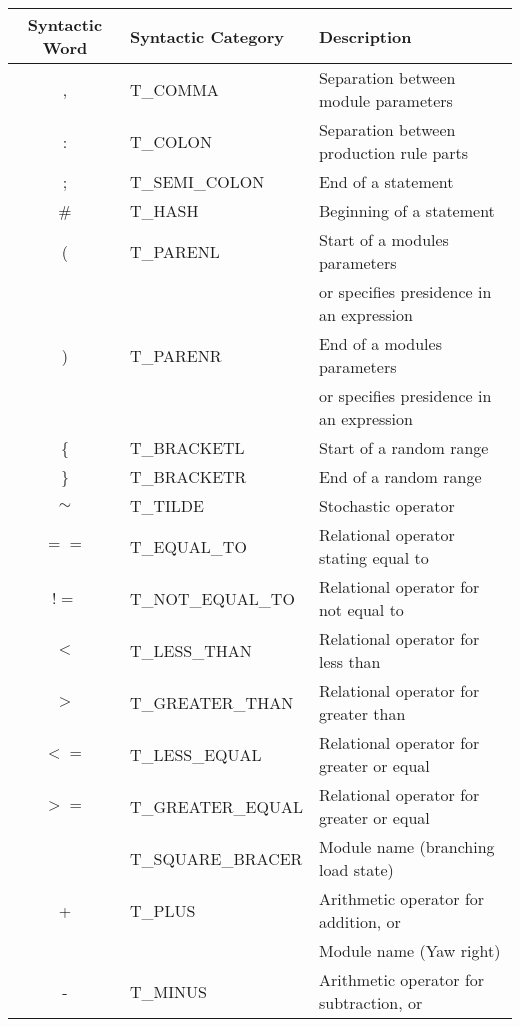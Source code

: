 \begin{table}[h!] \center
\begin{tabular}{ | c | l | l |}
\hline
	Syntactic Word	& Syntactic Category & Description\\  
\hline
\hline
	, 				& T\_COMMA 				& Separation between module parameters \\
\hline
	: 				& T\_COLON 				& Separation between production rule parts \\
\hline
	; 				& T\_SEMI\_COLON 		& End of a statement\\
\hline
	\#				& T\_HASH 				& Beginning of a statement\\
\hline
	( 				& T\_PARENL 			& Start of a modules parameters \\
					&						& or specifies presidence in an expression \\
\hline
	) 				& T\_PARENR 			& End of a modules parameters \\
					&						& or specifies presidence in an expression \\
\hline
	\{ 				& T\_BRACKETL 			& Start of a random range\\
\hline
	\} 				& T\_BRACKETR 			& End of a random range\\
\hline
	$\sim$ 			& T\_TILDE 				& Stochastic operator\\
\hline
	$==$				& T\_EQUAL\_TO 			& Relational operator stating equal to\\
\hline
	$!=$				& T\_NOT\_EQUAL\_TO 	& Relational operator for not equal to\\
\hline	
	$<$ 			& T\_LESS\_THAN 		& Relational operator for less than\\
\hline
	$>$ 			& T\_GREATER\_THAN 		& Relational operator for greater than\\
\hline
	$<=$ 			& T\_LESS\_EQUAL 		& Relational operator for greater or equal\\
\hline
	$>=$  			& T\_GREATER\_EQUAL 	& Relational operator for greater or equal\\
\hline
	[ 				& T\_SQUARE\_BRACEL 	& Module name (branching save state) \\
\hline
	] 				& T\_SQUARE\_BRACER 	& Module name (branching load state) \\
\hline
	+ 				& T\_PLUS 				& Arithmetic operator for addition, or\\
					&						& Module name (Yaw right) \\
\hline
	- 				& T\_MINUS 				& Arithmetic operator for subtraction, or\\

\end{tabular}
\end{table}
